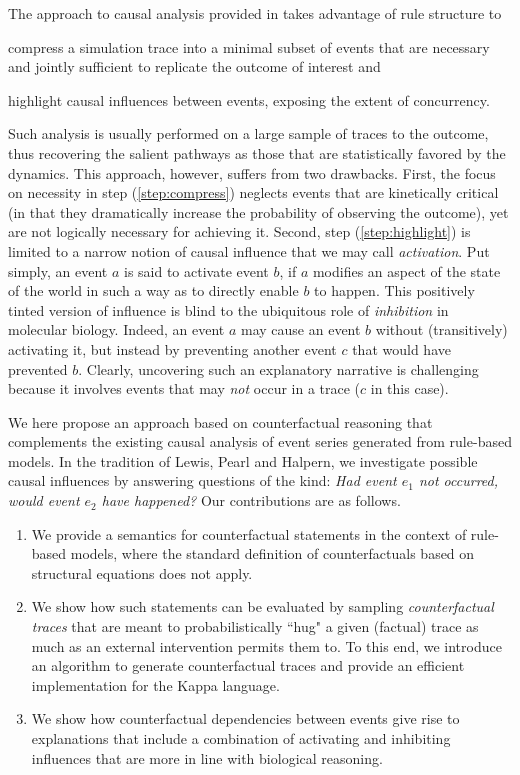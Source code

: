 The approach to causal analysis provided in \cite{DBLP:conf/fsttcs/DanosFFHH12,DanosEtAl-CONCUR07} takes advantage of rule structure to
\begin{inparaenum}[(i)]
\item \label{step:compress} compress a simulation trace into a
  minimal subset of events that are necessary and jointly sufficient
  to replicate the outcome of interest and
\item \label{step:highlight} highlight causal influences between
events, exposing the extent of concurrency.
\end{inparaenum}
Such analysis is usually performed on a large sample of traces to the outcome, thus recovering the salient pathways as those that are statistically favored by the dynamics. This approach, however, suffers from two drawbacks. First, the focus on necessity in step (\ref{step:compress}) neglects events that are kinetically critical (in that they dramatically increase the probability of observing the outcome), yet are not logically necessary for achieving it. Second, step (\ref{step:highlight}) is limited to a narrow notion of causal influence that we may call \emph{activation}. Put simply, an event $a$ is said to activate event $b$, if $a$ modifies an aspect of the state of the world in such a way as to directly enable $b$ to happen. This positively tinted version of influence is blind to the ubiquitous role of \emph{inhibition} in molecular biology.  Indeed, an event $a$ may cause an event $b$ without (transitively) activating it, but instead by preventing another event $c$ that would have prevented $b$. Clearly, uncovering such an explanatory narrative is challenging because it involves events that may \emph{not} occur in a trace ($c$ in this case).

We here propose an approach based on counterfactual reasoning that complements the existing causal analysis of event series generated from rule-based models. In the tradition of Lewis, Pearl and Halpern, we investigate possible causal influences by answering questions of the kind: \textit{Had event $e_1$ not occurred, would event $e_2$ have happened?}
Our contributions are as follows.
\begin{enumerate}
\item We provide a semantics for counterfactual statements in the context of rule-based models, where the standard definition of counterfactuals based on structural equations \cite{pearl2009causality} does not apply.
\item We show how such statements can be evaluated by sampling
\emph{counterfactual traces} that are meant to probabilistically ``hug" a given (factual) trace as much as an external intervention permits them to. To this end, we introduce an algorithm to generate counterfactual traces and provide an efficient implementation for the Kappa language.
\item We show how counterfactual dependencies between events give rise to explanations that include a combination of activating and inhibiting influences that are more in line with biological reasoning.
\end{enumerate}
